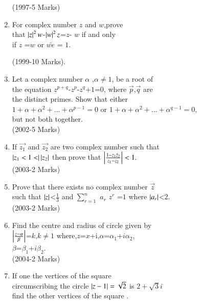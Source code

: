 \documentclass[journal]{IEEEtran}
\theoremstyle{remark}
\begin{document}
\begin{enumerate}[start=7]
\hfill(1997-5 Marks)\\
\item For complex number $z$ and $w$,prove \\
that $\left\vert z\right\vert^2w$-$\left\vert w\right\vert^2z$=$z$- $w$  if and only \\
if $z$ =$w$ or $\bar{we} $ = $1$.
   
\hfill(1999-10 Marks).\\
\item Let a complex number $\alpha$ ,$\alpha \not=1$, be a root of \\
the equation $z^{p+q}$-$z^p$-$z^q$+$1$=$0$, where $\Vec{p}$,$\Vec{q}$ are \\
the distinct primes. Show that either \\
$1+\alpha+\alpha^2+...+\alpha^{p-1}=0$ or $1+\alpha+\alpha^2+...+\alpha^{q- 1}=0$,\\
but not both together. \\

\hfill(2002-5 Marks)\\
\item If $\vec{z_1}$ and $\vec{z_2}$ are two  complex number such that\\$\left\vert z_1<1<\right\vert\left\vert z_2\right\vert$ then prove that $\left\vert\frac{1-z_1 \bar z_2}{z_1-z_2}\right\vert<1.$\\ 
    
    \hfill(2003-2 Marks)\\
\item Prove that there exists no  complex number $\vec{z}$ \\such that $\left\vert z\right\vert$<$\frac{1}{3}$ and  $\sum_{r=1}^{n}$ $a_r$ $z^r$ =$1$ where $\left\vert a_r\right\vert$<$2$.\\
      
 \hfill (2003-2 Marks)\\
\item Find the centre and radius  of circle given by\\
    $\left\vert\frac{z-\alpha} \beta\right\vert$=$k$,$k\not=1$ 
where,$z$=$x$+i,$\alpha$=$\alpha_1$+$i\alpha_2$, \\
$\beta$=$\beta_1$+$i\beta_2$. \\
    
\hfill(2004-2 Marks) \\     
\item If one the vertices of the square \\
circumscribing the circle $\left\vert z-1\right\vert = \sqrt{2}$ is $2 +\sqrt{3} i $ \\      
find the other vertices of the square .\\


\end{enumerate}
\end{document}
